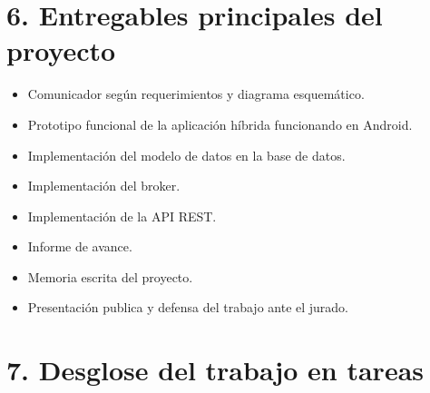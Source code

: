 \documentclass[
11pt, %
codirector, %
]{charter}
\begin{document}

\section{6. Entregables principales del proyecto}
\label{sec:entregables}


\begin{itemize}
	\item Comunicador según requerimientos y diagrama esquemático.
	\item Prototipo funcional de la aplicación híbrida funcionando en Android.
	\item Implementación del modelo de datos en la base de datos.
	\item Implementación del broker.
	\item Implementación de la API REST.
	\item Informe de avance.
	\item Memoria escrita del proyecto.
	\item Presentación publica y defensa del trabajo ante el jurado.
\end{itemize}


\section{7. Desglose del trabajo en tareas}
\label{sec:wbs}

\end{document}
